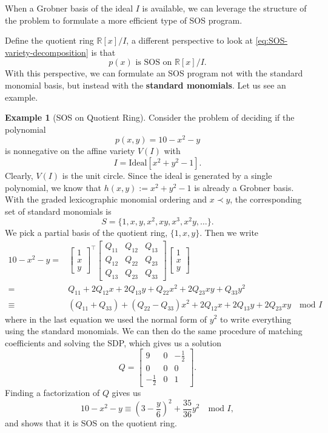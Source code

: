 \documentclass[
]{book}
\theoremstyle{definition}
\theoremstyle{definition}
\newtheorem{example}{Example}[chapter]
\theoremstyle{definition}
\theoremstyle{definition}
\theoremstyle{remark}
\begin{document}
When a Grobner basis of the ideal \(I\) is available, we can leverage the structure of the problem to formulate a more efficient type of SOS program.

Define the quotient ring \(\mathbb{R}[x]/I\), a different perspective to look at \eqref{eq:SOS-variety-decomposition} is that
\[
p(x) \text{ is SOS on } \mathbb{R}[x]/I.
\]
With this perspective, we can formulate an SOS program not with the standard monomial basis, but instead with the \textbf{standard monomials}. Let us see an example.

\begin{example}[SOS on Quotient Ring]
\protect\hypertarget{exm:SOSonQuotientRing}{}\label{exm:SOSonQuotientRing}Consider the problem of deciding if the polynomial
\[
p(x,y) = 10 - x^2 - y
\]
is nonnegative on the affine variety \(V(I)\) with
\[
I = \mathrm{Ideal}[x^2 + y^2 - 1].
\]
Clearly, \(V(I)\) is the unit circle. Since the ideal is generated by a single polynomial, we know that \(h(x,y):= x^2 + y^2 - 1\) is already a Grobner basis. With the graded lexicographic monomial ordering and \(x \prec y\), the corresponding set of standard monomials is
\[
S = \{ 1,x,y,x^2, xy, x^3, x^2 y, \dots \}.
\]
We pick a partial basis of the quotient ring, \(\{ 1,x,y \}\). Then we write
\begin{equation}
\begin{split}
10 - x^2 - y = &  \begin{bmatrix} 1 \\ x \\ y \end{bmatrix}^\top\begin{bmatrix} Q_{11} & Q_{12} & Q_{13} \\ Q_{12} & Q_{22} & Q_{23} \\ Q_{13} & Q_{23} & Q_{33} \end{bmatrix} \begin{bmatrix} 1 \\ x \\ y \end{bmatrix} \\
= & Q_{11} + 2 Q_{12}x + 2 Q_{13} y + Q_{22} x^2 + 2 Q_{23} xy + Q_{33} y^2 \\
\equiv & (Q_{11} + Q_{33}) + (Q_{22} - Q_{33}) x^2 + 2 Q_{12} x + 2 Q_{13} y + 2 Q_{23} xy \quad \text{mod }I 
\end{split}
\end{equation}
where in the last equation we used the normal form of \(y^2\) to write everything using the standard monomials. We can then do the same procedure of matching coefficients and solving the SDP, which gives us a solution
\[
Q = \begin{bmatrix} 9 & 0 & -\frac{1}{2} \\
0 & 0 & 0 \\
- \frac{1}{2} & 0 & 1 
\end{bmatrix}.
\]
Finding a factorization of \(Q\) gives us
\[
10 - x^2 - y \equiv \left( 3 - \frac{y}{6} \right)^2 + 
\frac{35}{36} y^2 \quad \text{mod }I,
\]
and shows that it is SOS on the quotient ring.


\end{example}
\end{document}

